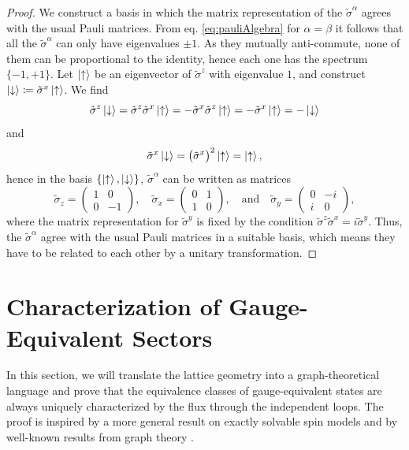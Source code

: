 \documentclass[%
fontsize=12pt, %
twoside=off %
]{scrbook}
\begin{document}
\begin{proof}
	We construct a basis in which the matrix representation of the $\tilde\sigma^\alpha$ agrees with the usual Pauli matrices. From eq. \ref{eq:pauliAlgebra} for $\alpha=\beta$ it follows that all the $\tilde\sigma^\alpha$ can only have eigenvalues $\pm 1$. As they mutually anti-commute, none of them can be proportional to the identity, hence each one has the spectrum $\{-1,+1\}$. Let $\ket{\uparrow}$ be an eigenvector of $\tilde\sigma^z$ with eigenvalue $1$, and construct $\ket{\downarrow}\coloneq\tilde\sigma^x\ket{\uparrow}$. We find
	\begin{equation}
		\tilde\sigma^z\ket{\downarrow} = 	\tilde\sigma^z	\tilde\sigma^x \ket{\uparrow} = -\tilde\sigma^x	\tilde\sigma^z \ket{\uparrow} =-\tilde\sigma^x \ket{\uparrow}= - \ket{\downarrow}
	\end{equation}
	and
	\begin{equation}
		\tilde\sigma^x \ket{\downarrow} = \big(\tilde\sigma^x\big)^2\ket{\uparrow} = \ket{\uparrow},
	\end{equation}
	hence in the basis $\left\{\ket{\uparrow},\ket{\downarrow}\right\}$, $\tilde\sigma^{\alpha}$ can be written as matrices
	\begin{equation}
		\tilde\sigma_z =
		\begin{pmatrix}
			1 & 0\\
			0 & -1
		\end{pmatrix},
		\quad
		\tilde\sigma_x =
		\begin{pmatrix}
			0 & 1\\
			1 & 0
		\end{pmatrix},\quad\text{and}\quad
		\tilde\sigma_y =
		\begin{pmatrix}
			0 & -i\\
			i & 0
		\end{pmatrix},
	\end{equation}
	where the matrix representation for $\tilde\sigma^y$ is fixed by the condition  $\tilde\sigma^z\tilde\sigma^x = i\tilde\sigma^y$. Thus, the $\tilde\sigma^\alpha$ agree with the usual Pauli matrices in a suitable basis, which means they have to be related to each other by a unitary transformation.
\end{proof}


\section{Characterization of Gauge-Equivalent Sectors}
\label{sec:characterizationOfGaugeEquivalenceClasses}
In this section, we will translate the lattice geometry into a graph-theoretical language and prove that the equivalence classes of gauge-equivalent states are always uniquely characterized by the flux through the independent loops. The proof is inspired by a more general result on exactly solvable spin models \cite{geometricCriterion} and by well-known results from graph theory \cite{cyclomaticberge}.
\end{document}
